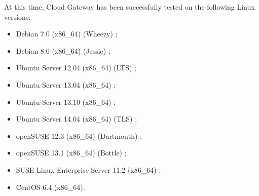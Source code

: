 \documentclass[11pt,fleqn,openany]{book} %
\begin{document}
At this time, Cloud Gateway has been successfully tested on the following Linux versions:\\
\begin{itemize}
\item Debian 7.0 (x86\_64) (Wheezy) ;
\item Debian 8.0 (x86\_64) (Jessie) ;
\item Ubuntu Server 12.04 (x86\_64) (LTS) ;
\item Ubuntu Server 13.04 (x86\_64) ;
\item Ubuntu Server 13.10 (x86\_64) ;
\item Ubuntu Server 14.04 (x86\_64) (TLS) ;
\item openSUSE 12.3 (x86\_64) (Dartmouth) ;
\item openSUSE 13.1 (x86\_64) (Bottle) ;
\item SUSE Linux Enterprise Server 11.2 (x86\_64) ;
\item CentOS 6.4 (x86\_64).\\
\end{itemize}






\end{document}

